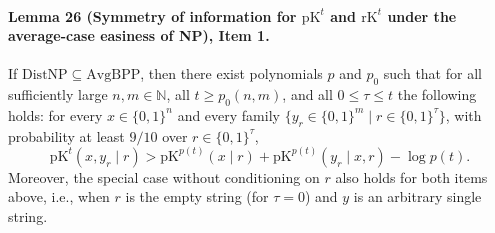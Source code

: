 \paragraph{Lemma 26 (Symmetry of information for $\mathrm{pK}^t$ and $\mathrm{rK}^t$ under the average-case easiness of NP), Item 1.} If $\mathrm{DistNP}\subseteq\mathrm{AvgBPP}$, then there exist polynomials $p$ and $p_0$ such that for all sufficiently large $n,m\in\mathbb N$, all $t\geq p_0(n,m)$, and all $0\leq\tau\leq t$ the following holds: for every $x\in\{0,1\}^n$ and every family $\{y_r\in\{0,1\}^m\mid r\in\{0,1\}^\tau\}$, with probability at least $9/10$ over $r\in\{0,1\}^\tau$,
\[\mathrm{pK}^t(x,y_r\mid r)>\mathrm{pK}^{p(t)}(x\mid r)+\mathrm{pK}^{p(t)}(y_r\mid x,r)-\log p(t).\]
Moreover, the special case without conditioning on $r$ also holds for both items above, i.e., when $r$ is the empty string (for $\tau=0$) and $y$ is an arbitrary single string.
